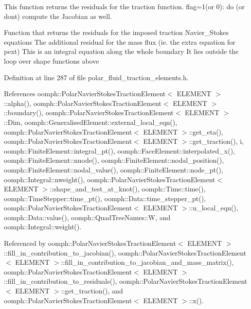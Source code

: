 This function returns the residuals for the traction function. flag=1(or 0)\+: do (or don\textquotesingle{}t) compute the Jacobian as well. 

Function that returns the residuals for the imposed traction Navier\+\_\+\+Stokes equations The additional residual for the mass flux (ie. the extra equation for pext) This is an integral equation along the whole boundary It lies outside the loop over shape functions above 

Definition at line 287 of file polar\+\_\+fluid\+\_\+traction\+\_\+elements.\+h.



References oomph\+::\+Polar\+Navier\+Stokes\+Traction\+Element$<$ E\+L\+E\+M\+E\+N\+T $>$\+::alpha(), oomph\+::\+Polar\+Navier\+Stokes\+Traction\+Element$<$ E\+L\+E\+M\+E\+N\+T $>$\+::boundary(), oomph\+::\+Polar\+Navier\+Stokes\+Traction\+Element$<$ E\+L\+E\+M\+E\+N\+T $>$\+::\+Dim, oomph\+::\+Generalised\+Element\+::external\+\_\+local\+\_\+eqn(), oomph\+::\+Polar\+Navier\+Stokes\+Traction\+Element$<$ E\+L\+E\+M\+E\+N\+T $>$\+::get\+\_\+eta(), oomph\+::\+Polar\+Navier\+Stokes\+Traction\+Element$<$ E\+L\+E\+M\+E\+N\+T $>$\+::get\+\_\+traction(), i, oomph\+::\+Finite\+Element\+::integral\+\_\+pt(), oomph\+::\+Face\+Element\+::interpolated\+\_\+x(), oomph\+::\+Finite\+Element\+::nnode(), oomph\+::\+Finite\+Element\+::nodal\+\_\+position(), oomph\+::\+Finite\+Element\+::nodal\+\_\+value(), oomph\+::\+Finite\+Element\+::node\+\_\+pt(), oomph\+::\+Integral\+::nweight(), oomph\+::\+Polar\+Navier\+Stokes\+Traction\+Element$<$ E\+L\+E\+M\+E\+N\+T $>$\+::shape\+\_\+and\+\_\+test\+\_\+at\+\_\+knot(), oomph\+::\+Time\+::time(), oomph\+::\+Time\+Stepper\+::time\+\_\+pt(), oomph\+::\+Data\+::time\+\_\+stepper\+\_\+pt(), oomph\+::\+Polar\+Navier\+Stokes\+Traction\+Element$<$ E\+L\+E\+M\+E\+N\+T $>$\+::u\+\_\+local\+\_\+eqn(), oomph\+::\+Data\+::value(), oomph\+::\+Quad\+Tree\+Names\+::W, and oomph\+::\+Integral\+::weight().



Referenced by oomph\+::\+Polar\+Navier\+Stokes\+Traction\+Element$<$ E\+L\+E\+M\+E\+N\+T $>$\+::fill\+\_\+in\+\_\+contribution\+\_\+to\+\_\+jacobian(), oomph\+::\+Polar\+Navier\+Stokes\+Traction\+Element$<$ E\+L\+E\+M\+E\+N\+T $>$\+::fill\+\_\+in\+\_\+contribution\+\_\+to\+\_\+jacobian\+\_\+and\+\_\+mass\+\_\+matrix(), oomph\+::\+Polar\+Navier\+Stokes\+Traction\+Element$<$ E\+L\+E\+M\+E\+N\+T $>$\+::fill\+\_\+in\+\_\+contribution\+\_\+to\+\_\+residuals(), oomph\+::\+Polar\+Navier\+Stokes\+Traction\+Element$<$ E\+L\+E\+M\+E\+N\+T $>$\+::get\+\_\+traction(), and oomph\+::\+Polar\+Navier\+Stokes\+Traction\+Element$<$ E\+L\+E\+M\+E\+N\+T $>$\+::x().

